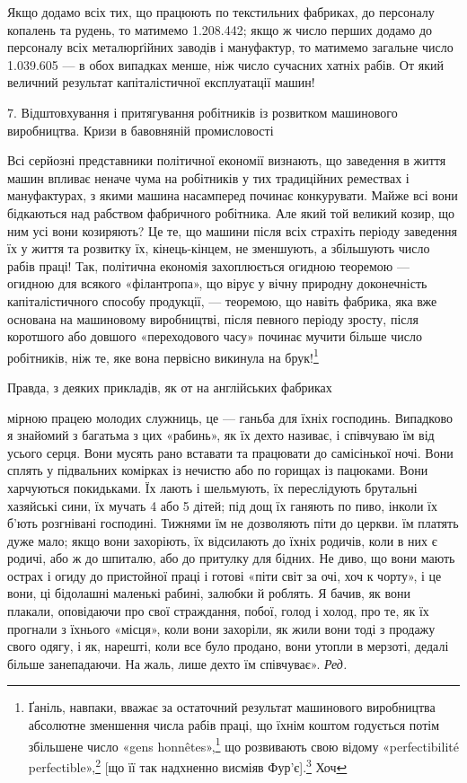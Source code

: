 Якщо додамо всіх тих, що працюють по текстильних фабриках,
до персоналу копалень та рудень, то матимемо 1.208.442;
якщо ж число перших додамо до персоналу всіх металюрґійних
заводів і мануфактур, то матимемо загальне число 1.039.605 —
в обох випадках менше, ніж число сучасних хатніх рабів. От
який величний результат капіталістичної експлуатації машин!

7. Відштовхування і притягування робітників із розвитком
машинового виробництва. Кризи в бавовняній промисловості

Всі серйозні представники політичної економії визнають,
що заведення в життя машин впливає неначе чума на робітників
у тих традиційних ремествах і мануфактурах, з якими машина
насамперед починає конкурувати. Майже всі вони бідкаються
над рабством фабричного робітника. Але який той великий козир,
що ним усі вони козиряють? Це те, що машини після всіх страхіть
періоду заведення їх у життя та розвитку їх, кінець-кінцем,
не зменшують, а збільшують число рабів праці! Так, політична
економія захоплюється огидною теоремою — огидною для всякого
«філантропа», що вірує у вічну природну доконечність капіталістичного
способу продукції, — теоремою, що навіть фабрика,
яка вже основана на машиновому виробництві, після певного
періоду зросту, після коротшого або довшого «переходового
часу» починає мучити більше число робітників, ніж те, яке вона
первісно викинула на брук!\footnote{
Ґаніль, навпаки, вважає за остаточний результат машинового виробництва
абсолютне зменшення числа рабів праці, що їхнім коштом годується
потім збільшене число «gens honnêtes»,\footnote*{
— порядних людей. \emph{Ред.}
} що розвивають свою відому
«perfectibilité perfectible»,\footnote*{
— здібну вдосконалюватися здібність до вдосконалення. \emph{Ред.}
} [що її так надхненно висміяв Фур’є].\footnote*{
Заведений у прямі дужки кінець речення беремо з французького
видання. \emph{Ред.}
} Хоч
}

Правда, з деяких прикладів, як от на англійських фабриках

мірною працею молодих служниць, це — ганьба для їхніх господинь.
Випадково я знайомий з багатьма з цих «рабинь», як їх дехто називає,
і співчуваю їм від усього серця. Вони мусять рано вставати та працювати
до самісінької ночі. Вони сплять у підвальних комірках із нечистю або
по горищах із пацюками. Вони харчуються покидьками. Їх лають і шельмують,
їх переслідують брутальні хазяйські сини, їх мучать 4 або 5 дітей;
під дощ їх ганяють по пиво, інколи їх б’ють розгнівані господині. Тижнями
їм не дозволяють піти до церкви. їм платять дуже мало; якщо вони
захоріють, їх відсилають до їхніх родичів, коли в них є родичі, або ж до
шпиталю, або до притулку для бідних. Не диво, що вони мають острах
і огиду до пристойної праці і готові «піти світ за очі, хоч к чорту», і це
вони, ці бідолашні маленькі рабині, залюбки й роблять. Я бачив, як вони
плакали, оповідаючи про свої страждання, побої, голод і холод, про те,
як їх прогнали з їхнього «місця», коли вони захоріли, як жили вони
тоді з продажу свого одягу, і як, нарешті, коли все було продано, вони
утопли в мерзоті, дедалі більше занепадаючи. На жаль, лише дехто їм
співчуває». \emph{Ред.}
